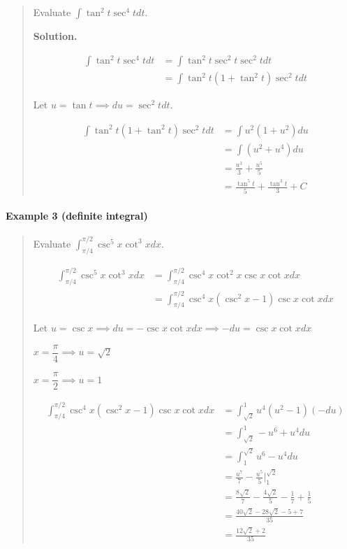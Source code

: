 \documentclass[
]{article}
\begin{document}
\begin{quote}
Evaluate \(\displaystyle \int \tan^2 t \sec^4 t dt\).

\textbf{Solution.}

\begin{align*}
\int \tan^2 t \sec^4 t dt &= \int \tan^2 t \sec^2 t \sec^2 t dt \\
&= \int \tan^2 t (1 + \tan^2 t) \sec^2 t dt
\end{align*}

Let \(u = \tan t \implies du = \sec^2 t dt\).

\begin{align*}
\int \tan^2 t (1 + \tan^2 t) \sec^2 t dt &= \int u^2 (1+u^2) du \\
&= \int (u^2 + u^4)du\\
&= \frac{u^3}{3} + \frac{u^5}{5}\\
&= \frac{\tan^5 t}{5} + \frac{\tan^3 t}{3} + C
\end{align*}
\end{quote}

\hypertarget{example-3-definite-integral}{%
\paragraph*{Example 3 (definite
integral)}\label{example-3-definite-integral}}

\begin{quote}
Evaluate \(\displaystyle \int_{\pi/4}^{\pi/2} \csc^5 x \cot^3 x dx\).

\begin{align*}
\int_{\pi/4}^{\pi/2} \csc^5 x \cot^3 x dx &= \int_{\pi/4}^{\pi/2} \csc^4 x \cot^2 x \csc x\cot x dx\\
&= \int_{\pi/4}^{\pi/2} \csc^4 x (\csc^2 x - 1) \csc x\cot x dx
\end{align*}

Let
\(u = \csc x \implies du = -\csc x \cot x dx \implies -du = \csc x \cot x dx\)

\(x = \dfrac{\pi}{4} \implies u = \sqrt{2}\)

\(x = \dfrac{\pi}{2} \implies u = 1\)

\begin{align*}
\int_{\pi/4}^{\pi/2} \csc^4 x (\csc^2 x - 1) \csc x\cot x dx &= \int_{\sqrt{2}}^1 u^4(u^2-1)(-du)\\
&= \int_{\sqrt{2}}^1 - u^6 + u^4 du\\
&= \int_1^{\sqrt{2}} u^6 - u^4 du\\
&= \frac{u^7}{7} - \frac{u^5}{5} \Bigg|_1^{\sqrt{2}}\\
&= \frac{8\sqrt{2}}{7} - \frac{4\sqrt{2}}{5} - \frac{1}{7} + \frac{1}{5}\\
&= \frac{40\sqrt{2}-28\sqrt{2} -5 +7}{35}\\
&= \frac{12\sqrt{2} +2}{35}
\end{align*}
\end{quote}
\end{document}
